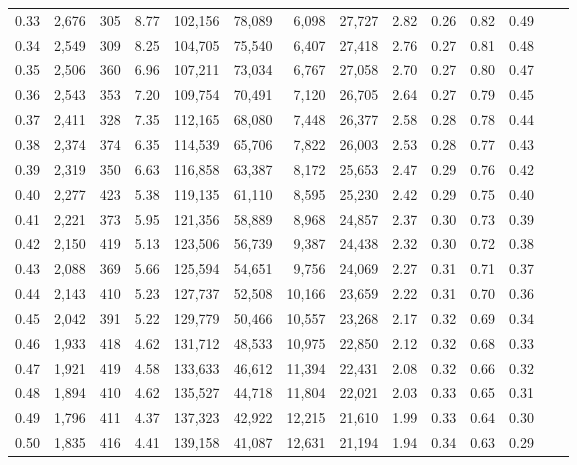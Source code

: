 \begin{tabular}{rrrrrrrrrrrrrr}
0.33 &  2,676 &  305 &    8.77 &  102,156 &   78,089 &   6,098 &  27,727 &  2.82 &  0.26 &  0.82 &      0.49 \\
0.34 &  2,549 &  309 &    8.25 &  104,705 &   75,540 &   6,407 &  27,418 &  2.76 &  0.27 &  0.81 &      0.48 \\
0.35 &  2,506 &  360 &    6.96 &  107,211 &   73,034 &   6,767 &  27,058 &  2.70 &  0.27 &  0.80 &      0.47 \\
0.36 &  2,543 &  353 &    7.20 &  109,754 &   70,491 &   7,120 &  26,705 &  2.64 &  0.27 &  0.79 &      0.45 \\
0.37 &  2,411 &  328 &    7.35 &  112,165 &   68,080 &   7,448 &  26,377 &  2.58 &  0.28 &  0.78 &      0.44 \\
0.38 &  2,374 &  374 &    6.35 &  114,539 &   65,706 &   7,822 &  26,003 &  2.53 &  0.28 &  0.77 &      0.43 \\
0.39 &  2,319 &  350 &    6.63 &  116,858 &   63,387 &   8,172 &  25,653 &  2.47 &  0.29 &  0.76 &      0.42 \\
0.40 &  2,277 &  423 &    5.38 &  119,135 &   61,110 &   8,595 &  25,230 &  2.42 &  0.29 &  0.75 &      0.40 \\
0.41 &  2,221 &  373 &    5.95 &  121,356 &   58,889 &   8,968 &  24,857 &  2.37 &  0.30 &  0.73 &      0.39 \\
0.42 &  2,150 &  419 &    5.13 &  123,506 &   56,739 &   9,387 &  24,438 &  2.32 &  0.30 &  0.72 &      0.38 \\
0.43 &  2,088 &  369 &    5.66 &  125,594 &   54,651 &   9,756 &  24,069 &  2.27 &  0.31 &  0.71 &      0.37 \\
0.44 &  2,143 &  410 &    5.23 &  127,737 &   52,508 &  10,166 &  23,659 &  2.22 &  0.31 &  0.70 &      0.36 \\
0.45 &  2,042 &  391 &    5.22 &  129,779 &   50,466 &  10,557 &  23,268 &  2.17 &  0.32 &  0.69 &      0.34 \\
0.46 &  1,933 &  418 &    4.62 &  131,712 &   48,533 &  10,975 &  22,850 &  2.12 &  0.32 &  0.68 &      0.33 \\
0.47 &  1,921 &  419 &    4.58 &  133,633 &   46,612 &  11,394 &  22,431 &  2.08 &  0.32 &  0.66 &      0.32 \\
0.48 &  1,894 &  410 &    4.62 &  135,527 &   44,718 &  11,804 &  22,021 &  2.03 &  0.33 &  0.65 &      0.31 \\
0.49 &  1,796 &  411 &    4.37 &  137,323 &   42,922 &  12,215 &  21,610 &  1.99 &  0.33 &  0.64 &      0.30 \\
0.50 &  1,835 &  416 &    4.41 &  139,158 &   41,087 &  12,631 &  21,194 &  1.94 &  0.34 &  0.63 &      0.29 \\

\end{tabular}
